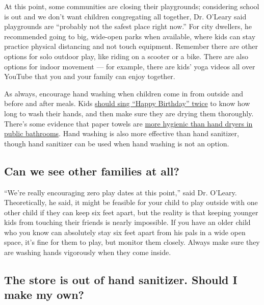 At this point, some communities are closing their playgrounds;
considering school is out and we don't want children congregating all
together, Dr. O'Leary said playgrounds are ``probably not the safest
place right now.'' For city dwellers, he recommended going to big,
wide-open parks when available, where kids can stay practice physical
distancing and not touch equipment. Remember there are other options for
solo outdoor play, like riding on a scooter or a bike. There are also
options for indoor movement --- for example, there are kids' yoga videos
all over YouTube that you and your family can enjoy together.

As always, encourage hand washing when children come in from outside and
before and after meals. Kids
\href{https://www.cdc.gov/handwashing/when-how-handwashing.html}{should
sing ``Happy Birthday'' twice} to know how long to wash their hands, and
then make sure they are drying them thoroughly. There's some evidence
that paper towels are
\href{https://www.nytimes3xbfgragh.onion/2019/04/17/smarter-living/using-public-bathrooms.html}{more
hygienic than hand dryers in public bathrooms}. Hand washing is also
more effective than hand sanitizer, though hand sanitizer can be used
when hand washing is not an option.

\hypertarget{can-we-see-other-families-at-all}{%
\subsection{Can we see other families at
all?}\label{can-we-see-other-families-at-all}}

``We're really encouraging zero play dates at this point,'' said Dr.
O'Leary. Theoretically, he said, it might be feasible for your child to
play outside with one other child if they can keep six feet apart, but
the reality is that keeping younger kids from touching their friends is
nearly impossible. If you have an older child who you know can
absolutely stay six feet apart from his pals in a wide open space, it's
fine for them to play, but monitor them closely. Always make sure they
are washing hands vigorously when they come inside.

\hypertarget{the-store-is-out-of-hand-sanitizer-should-i-make-my-own}{%
\subsection{The store is out of hand sanitizer. Should I make my
own?}\label{the-store-is-out-of-hand-sanitizer-should-i-make-my-own}}

